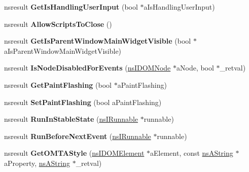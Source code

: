 \begin{DoxyCompactItemize}
nsresult {\bfseries Get\+Is\+Handling\+User\+Input} (bool $\ast$a\+Is\+Handling\+User\+Input)
\item 
\mbox{\label{interfacens_i_d_o_m_window_utils_ad2470e3c94d5d3cbb998d669ee007781}} 
nsresult {\bfseries Allow\+Scripts\+To\+Close} ()
\item 
\mbox{\label{interfacens_i_d_o_m_window_utils_a5adb5ac90d0c170a953896bd6246b4c6}} 
nsresult {\bfseries Get\+Is\+Parent\+Window\+Main\+Widget\+Visible} (bool $\ast$a\+Is\+Parent\+Window\+Main\+Widget\+Visible)
\item 
\mbox{\label{interfacens_i_d_o_m_window_utils_a649d7e4b0ee37e6c0c3f5a2299a3aba0}} 
nsresult {\bfseries Is\+Node\+Disabled\+For\+Events} (\hyperlink{interfacens_i_d_o_m_node}{ns\+I\+D\+O\+M\+Node} $\ast$a\+Node, bool $\ast$\+\_\+retval)
\item 
\mbox{\label{interfacens_i_d_o_m_window_utils_a3ae27e836caf75949d9d405971399149}} 
nsresult {\bfseries Get\+Paint\+Flashing} (bool $\ast$a\+Paint\+Flashing)
\item 
\mbox{\label{interfacens_i_d_o_m_window_utils_aae8d9f6975980e5ec70b99fb3df662c2}} 
nsresult {\bfseries Set\+Paint\+Flashing} (bool a\+Paint\+Flashing)
\item 
\mbox{\label{interfacens_i_d_o_m_window_utils_a819057087210a58ea99dc1b5c9e6c1dc}} 
nsresult {\bfseries Run\+In\+Stable\+State} (\hyperlink{interfacens_i_runnable}{ns\+I\+Runnable} $\ast$runnable)
\item 
\mbox{\label{interfacens_i_d_o_m_window_utils_a9d35e9b24c275d265f75aa945d16700f}} 
nsresult {\bfseries Run\+Before\+Next\+Event} (\hyperlink{interfacens_i_runnable}{ns\+I\+Runnable} $\ast$runnable)
\item 
\mbox{\label{interfacens_i_d_o_m_window_utils_ad32761647ce0d6f7675cedd865b9208c}} 
nsresult {\bfseries Get\+O\+M\+T\+A\+Style} (\hyperlink{interfacens_i_d_o_m_element}{ns\+I\+D\+O\+M\+Element} $\ast$a\+Element, const \hyperlink{structns_string_container}{ns\+A\+String} $\ast$a\+Property, \hyperlink{structns_string_container}{ns\+A\+String} $\ast$\+\_\+retval)

\end{DoxyCompactItemize}
